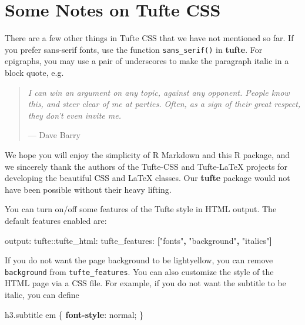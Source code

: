\documentclass[]{tufte-book}
\newenvironment{Shaded}{}{}
\newcommand{\AttributeTok}[1]{\textcolor[rgb]{0.49,0.56,0.16}{#1}}
\newcommand{\DecValTok}[1]{\textcolor[rgb]{0.25,0.63,0.44}{#1}}
\newcommand{\FunctionTok}[1]{\textcolor[rgb]{0.02,0.16,0.49}{#1}}
\newcommand{\KeywordTok}[1]{\textcolor[rgb]{0.00,0.44,0.13}{\textbf{#1}}}
\newcommand{\NormalTok}[1]{#1}
\newcommand{\StringTok}[1]{\textcolor[rgb]{0.25,0.44,0.63}{#1}}
\begin{document}
\hypertarget{some-notes-on-tufte-css}{%
\chapter{Some Notes on Tufte CSS}\label{some-notes-on-tufte-css}}

There are a few other things in Tufte CSS that we have not mentioned so
far. If you prefer \textsf{sans-serif fonts}, use the function
\texttt{sans\_serif()} in \textbf{tufte}. For epigraphs, you may use a
pair of underscores to make the paragraph italic in a block quote, e.g.

\begin{quote}
\emph{I can win an argument on any topic, against any opponent. People
know this, and steer clear of me at parties. Often, as a sign of their
great respect, they don't even invite me.}

\hfill --- Dave Barry
\end{quote}

We hope you will enjoy the simplicity of R Markdown and this R package,
and we sincerely thank the authors of the Tufte-CSS and Tufte-LaTeX
projects for developing the beautiful CSS and LaTeX classes. Our
\textbf{tufte} package would not have been possible without their heavy
lifting.

You can turn on/off some features of the Tufte style in HTML output. The
default features enabled are:

\begin{Shaded}
\begin{Highlighting}[]
\FunctionTok{output:}
  \FunctionTok{tufte:}\AttributeTok{:tufte_html:}
    \FunctionTok{tufte_features:}\AttributeTok{ }\KeywordTok{[}\StringTok{"fonts"}\KeywordTok{,} \StringTok{"background"}\KeywordTok{,} \StringTok{"italics"}\KeywordTok{]}
\end{Highlighting}
\end{Shaded}

If you do not want the page background to be lightyellow, you can remove
\texttt{background} from \texttt{tufte\_features}. You can also
customize the style of the HTML page via a CSS file. For example, if you
do not want the subtitle to be italic, you can define

\begin{Shaded}
\begin{Highlighting}[]
\NormalTok{h3}\FunctionTok{.subtitle}\NormalTok{ em \{}
  \KeywordTok{font-style}\NormalTok{: }\DecValTok{normal}\NormalTok{;}
\NormalTok{\}}
\end{Highlighting}
\end{Shaded}
\end{document}
